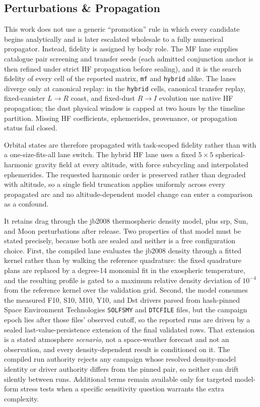         \subsection{Perturbations \& Propagation} \label{ss:propagation}
        This work does not use a generic ``promotion'' rule in which every candidate begins analytically and is later escalated wholesale to a fully numerical propagator. Instead, fidelity is assigned by body role. The MF lane supplies catalogue pair screening and transfer seeds (each admitted conjunction anchor is then refined under strict HF propagation before sealing), and it is the search fidelity of every cell of the reported matrix, \texttt{mf} and \texttt{hybrid} alike. The lanes diverge only at canonical replay: in the \texttt{hybrid} cells, canonical transfer replay, fixed-canister \(L\rightarrow R\) coast, and fixed-dust \(R\rightarrow I\) evolution use native HF propagation; the dust physical window is capped at two hours by the timeline partition. Missing HF coefficients, ephemerides, provenance, or propagation status fail closed.

        Orbital states are therefore propagated with task-scoped fidelity rather than with a one-size-fits-all lane switch. The hybrid HF lane uses a fixed \(5\times5\) spherical-harmonic gravity field at every altitude, with force subcycling and interpolated ephemerides. The requested harmonic order is preserved rather than degraded with altitude, so a single field truncation applies uniformly across every propagated arc and no altitude-dependent model change can enter a comparison as a confound.

        It retains drag through the \gls{jb2008} thermospheric density model, plus \gls{srp}, Sun, and Moon perturbations after release. Two properties of that model must be stated precisely, because both are sealed and neither is a free configuration choice. First, the compiled lane evaluates the \gls{jb2008} density through a fitted kernel rather than by walking the reference quadrature: the fixed quadrature plans are replaced by a degree-14 monomial fit in the exospheric temperature, and the resulting profile is gated to a maximum relative density deviation of \(10^{-4}\) from the reference kernel over the validation grid. Second, the model consumes the measured F10, S10, M10, Y10, and Dst drivers parsed from hash-pinned Space Environment Technologies \texttt{SOLFSMY} and \texttt{DTCFILE} files, but the campaign epoch lies after those files' observed cutoff, so the reported runs are driven by a sealed last-value-persistence extension of the final validated rows. That extension is a stated atmosphere \emph{scenario}, not a space-weather forecast and not an observation, and every density-dependent result is conditioned on it. The compiled run authority rejects any campaign whose resolved density-model identity or driver authority differs from the pinned pair, so neither can drift silently between runs. Additional terms remain available only for targeted model-form stress tests when a specific sensitivity question warrants the extra complexity.

